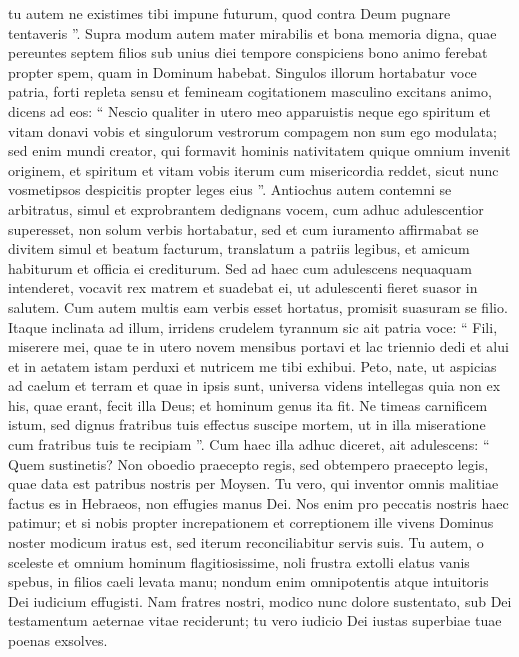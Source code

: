 \begin{biblechapter}
\begin{biblechapter}
\begin{biblechapter}
\begin{biblechapter}
\begin{biblechapter}
\begin{biblechapter}
\begin{biblechapter}
\verse tu autem ne existimes tibi impune futurum, quod contra Deum pugnare tentaveris ”.
 \verse Supra modum autem mater mirabilis et bona memoria digna, quae pereuntes septem filios sub unius diei tempore conspiciens bono animo ferebat propter spem, quam in Dominum habebat. 
\verse Singulos illorum hortabatur voce patria, forti repleta sensu et femineam cogitationem masculino excitans animo, dicens ad eos: 
\verse “ Nescio qualiter in utero meo apparuistis neque ego spiritum et vitam donavi vobis et singulorum vestrorum compagem non sum ego modulata; 
\verse sed enim mundi creator, qui formavit hominis nativitatem quique omnium invenit originem, et spiritum et vitam vobis iterum cum misericordia reddet, sicut nunc vosmetipsos despicitis propter leges eius ”. 
\verse Antiochus autem contemni se arbitratus, simul et exprobrantem dedignans vocem, cum adhuc adulescentior superesset, non solum verbis hortabatur, sed et cum iuramento affirmabat se divitem simul et beatum facturum, translatum a patriis legibus, et amicum habiturum et officia ei crediturum. 
\verse Sed ad haec cum adulescens nequaquam intenderet, vocavit rex matrem et suadebat ei, ut adulescenti fieret suasor in salutem. 
\verse Cum autem multis eam verbis esset hortatus, promisit suasuram se filio. 
\verse Itaque inclinata ad illum, irridens crudelem tyrannum sic ait patria voce: “ Fili, miserere mei, quae te in utero novem mensibus portavi et lac triennio dedi et alui et in aetatem istam perduxi et nutricem me tibi exhibui. 
\verse Peto, nate, ut aspicias ad caelum et terram et quae in ipsis sunt, universa videns intellegas quia non ex his, quae erant, fecit illa Deus; et hominum genus ita fit. 
\verse Ne timeas carnificem istum, sed dignus fratribus tuis effectus suscipe mortem, ut in illa miseratione cum fratribus tuis te recipiam ”. 
\verse Cum haec illa adhuc diceret, ait adulescens: “ Quem sustinetis? Non oboedio praecepto regis, sed obtempero praecepto legis, quae data est patribus nostris per Moysen. 
\verse Tu vero, qui inventor omnis malitiae factus es in Hebraeos, non effugies manus Dei. 
\verse Nos enim pro peccatis nostris haec patimur; 
\verse et si nobis propter increpationem et correptionem ille vivens Dominus noster modicum iratus est, sed iterum reconciliabitur servis suis. 
\verse Tu autem, o sceleste et omnium hominum flagitiosissime, noli frustra extolli elatus vanis spebus, in filios caeli levata manu; 
\verse nondum enim omnipotentis atque intuitoris Dei iudicium effugisti. 
\verse Nam fratres nostri, modico nunc dolore sustentato, sub Dei testamentum aeternae vitae reciderunt; tu vero iudicio Dei iustas superbiae tuae poenas exsolves. 

\end{biblechapter}
\end{biblechapter}
\end{biblechapter}
\end{biblechapter}
\end{biblechapter}
\end{biblechapter}
\end{biblechapter}
